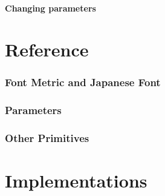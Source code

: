 \documentclass[a4paper,titlepage]{article}
\begin{document}
\subsection{Changing parameters}


\part{Reference}
\section{Font Metric and Japanese Font}
\section{Parameters}
\section{Other Primitives}
\part{Implementations}\label{part-imp}
\end{document}
